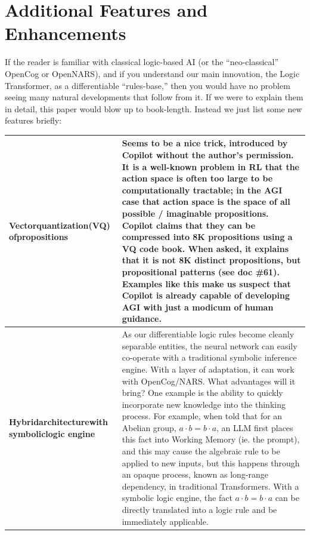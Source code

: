 \documentclass[runningheads]{llncs}
\begin{document}
\section{Additional Features and Enhancements}

If the reader is familiar with classical logic-based AI (or the ``neo-classical'' OpenCog or OpenNARS), and if you understand our main innovation, the Logic Transformer, as a differentiable ``rules-base,'' then you would have no problem seeing many natural developments that follow from it.  If we were to explain them in detail, this paper would blow up to book-length.  Instead we just list some new features briefly: \\
\hspace*{-1.5cm}
\small
\begin{longtable}{|p{2.5cm}|p{10cm}|}
	\hline \textbf{Vector\newline quantization\newline (VQ) of\newline propositions} & Seems to be a nice trick, introduced by Copilot without the author's permission.  It is a well-known problem in RL that the action space is often too large to be computationally tractable; in the AGI case that action space is the space of all possible / imaginable propositions.  Copilot claims that they can be compressed into 8K propositions using a VQ code book.  When asked, it explains that it is not 8K distinct propositions, but propositional patterns (see doc \#61).  Examples like this make us suspect that Copilot is already capable of developing AGI with just a modicum of human guidance. \\

	\hline \textbf{Hybrid\newline architecture\newline with symbolic\newline logic engine} & As our differentiable logic rules become cleanly separable entities, the neural network can easily co-operate with a traditional symbolic inference engine. With a layer of adaptation, it can work with OpenCog/NARS.  What advantages will it bring?  One example is the ability to quickly incorporate new knowledge into the thinking process. For example, when told that for an Abelian group, $a \cdot b = b \cdot a$, an LLM first places this fact into Working Memory (ie. the prompt), and this may cause the algebraic rule to be applied to new inputs, but this happens through an opaque process, known as long-range dependency, in traditional Transformers. With a symbolic logic engine, the fact $a \cdot b = b \cdot a$ can be directly translated into a logic rule and be immediately applicable. \\


\end{longtable}
\end{document}
